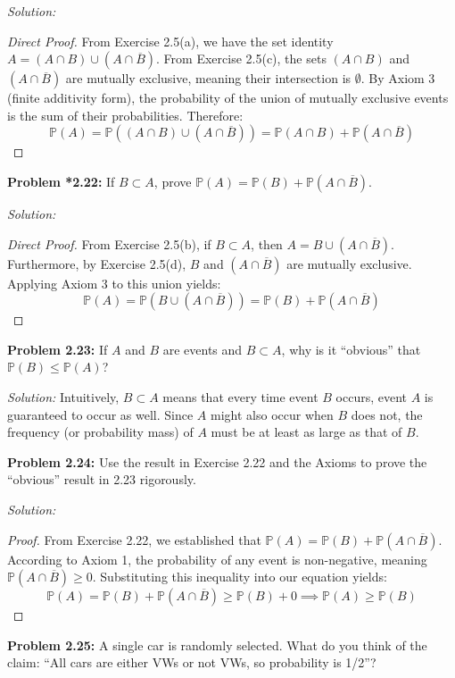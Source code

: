 \documentclass[11pt]{article}
\newcommand{\prob}[1]{\vspace{4mm}\noindent\textbf{Problem #1:}}
\newcommand{\sol}{\vspace{2mm}\noindent\textit{Solution: }}
\begin{document}
\sol 
\begin{proof}[Direct Proof]
From Exercise 2.5(a), we have the set identity $A = (A \cap B) \cup (A \cap \overline{B})$. From Exercise 2.5(c), the sets $(A \cap B)$ and $(A \cap \overline{B})$ are mutually exclusive, meaning their intersection is $\emptyset$. By Axiom 3 (finite additivity form), the probability of the union of mutually exclusive events is the sum of their probabilities. Therefore:
\[ \mathbb{P}(A) = \mathbb{P}((A \cap B) \cup (A \cap \overline{B})) = \mathbb{P}(A \cap B) + \mathbb{P}(A \cap \overline{B}) \]
\end{proof}

\prob{*2.22}
If $B \subset A$, prove $\mathbb{P}(A) = \mathbb{P}(B) + \mathbb{P}(A \cap \overline{B})$.

\sol 
\begin{proof}[Direct Proof]
From Exercise 2.5(b), if $B \subset A$, then $A = B \cup (A \cap \overline{B})$. Furthermore, by Exercise 2.5(d), $B$ and $(A \cap \overline{B})$ are mutually exclusive. Applying Axiom 3 to this union yields:
\[ \mathbb{P}(A) = \mathbb{P}(B \cup (A \cap \overline{B})) = \mathbb{P}(B) + \mathbb{P}(A \cap \overline{B}) \]
\end{proof}

\prob{2.23}
If $A$ and $B$ are events and $B \subset A$, why is it ``obvious'' that $\mathbb{P}(B) \le \mathbb{P}(A)$?

\sol 
Intuitively, $B \subset A$ means that every time event $B$ occurs, event $A$ is guaranteed to occur as well. Since $A$ might also occur when $B$ does not, the frequency (or probability mass) of $A$ must be at least as large as that of $B$.

\prob{2.24}
Use the result in Exercise 2.22 and the Axioms to prove the ``obvious'' result in 2.23 rigorously.

\sol 
\begin{proof}
From Exercise 2.22, we established that $\mathbb{P}(A) = \mathbb{P}(B) + \mathbb{P}(A \cap \overline{B})$. 
According to Axiom 1, the probability of any event is non-negative, meaning $\mathbb{P}(A \cap \overline{B}) \ge 0$. 
Substituting this inequality into our equation yields:
\[ \mathbb{P}(A) = \mathbb{P}(B) + \mathbb{P}(A \cap \overline{B}) \ge \mathbb{P}(B) + 0 \implies \mathbb{P}(A) \ge \mathbb{P}(B) \]
\end{proof}

\prob{2.25}
A single car is randomly selected. What do you think of the claim: ``All cars are either VWs or not VWs, so probability is 1/2''?
\end{document}
